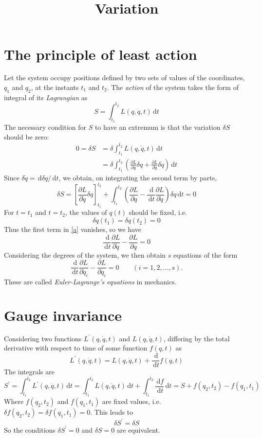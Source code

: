 \documentclass{article}
\title{Variation}
\newcommand{\be}{\begin{equation}}
\newcommand{\ee}{\end{equation}}
\newcommand{\dif}{\,\mathrm{d}}
\begin{document}
\maketitle

\section{The principle of least action}
Let the system occupy positions defined by two sets of values of the coordinates, $q_1$ and $q_2$, at the instants $t_1$ and $t_2$. The \emph{action} of the system takes the form of integral of its \emph{Lagrangian} as
\be
S=\int_{t_1}^{t_2}L(q,\dot{q},t) \dif t
\ee
The necessary condition for $S$ to have an extremum is that the variation $\delta S$ should be zero:
\be 
\begin{split}
0=\delta S &=\delta \int_{t_1}^{t_2}L(q,\dot{q},t) \dif t \\
&=\delta \int_{t_1}^{t_2} (\frac{\partial L}{\partial q} \delta q + \frac{\partial L}{\partial \dot{q}} \delta \dot{q}) \dif t
\end{split}
\ee
Since $\delta \dot{q}= \dif \delta q/ \dif t$, we obtain, on integrating the second term by parts,
\be 
\label{a}
\delta S =\left[\frac{\partial L}{\partial \dot{q}} \delta q\right]_{t_1}^{t_2} + \int_{t_1}^{t_2} (\frac{\partial L}{\partial q} - \frac{\dif}{\dif t} \frac{\partial L}{\partial \dot{q}}) \delta q \dif t = 0
\ee
For $t=t_1$ and $t=t_2$, the values of $q(t)$ should be fixed, i.e. 
\be 
\delta q(t_1)=\delta q(t_2)=0
\ee
Thus the first term in \eqref{a} vanishes, so we have
\be 
\label{l}
\frac{\dif}{\dif t} \frac{\partial L}{\partial \dot{q}} - \frac{\partial L}{\partial q}=0
\ee
Considering the degrees of the system, we then obtain $s$ equations of the form
\be 
\frac{\dif}{\dif t} \frac{\partial L}{\partial \dot{q}_i} - \frac{\partial L}{\partial q_i}=0 \qquad(i=1,2,...,s).
\ee
These are called \emph{Euler-Lagrange's equations} in mechanics.

\section{Gauge invariance}
Considering two functions $L^\prime(q,\dot{q},t)$ and $L(q,\dot{q},t)$, differing by the total derivative with respect to time of some function $f(q,t)$ as
\be 
L^\prime(q,\dot{q},t)=L(q,\dot{q},t)+\frac{\dif}{\dif t}f(q,t)
\ee
The integrals are
\[ 
S^\prime=\int_{t_1}^{t_2}L^\prime(q,\dot{q},t) \dif t=\int_{t_1}^{t_2}L(q,\dot{q},t) \dif t+\int_{t_1}^{t_2}\frac{\dif f}{\dif t} \dif t=S+f(q_2,t_2)-f(q_1,t_1)
\]
Where $f(q_2,t_2)$ and $f(q_1,t_1)$ are fixed values, i.e. $\delta f(q_2,t_2)=\delta f(q_1,t_1)=0$. This leads to
\be 
\delta S^\prime=\delta S
\ee
So the conditions $\delta S^\prime=0$ and $\delta S=0$ are equivalent.
\end{document}
